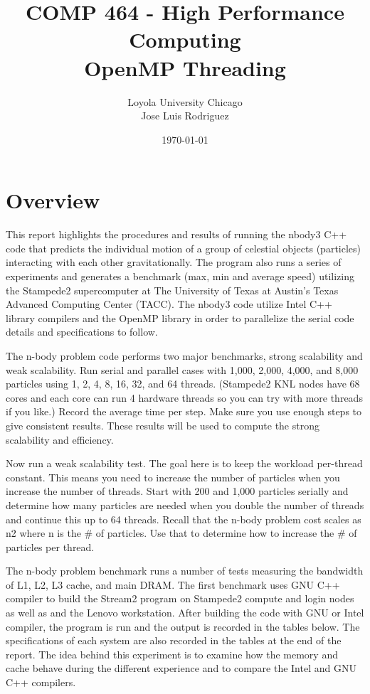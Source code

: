 \documentclass[12pt]{article} %
\title{ COMP 464 - High Performance Computing \\ OpenMP Threading} %
\author{
Loyola University Chicago \\
Jose Luis Rodriguez 
} %
\date{\today} %
\begin{document}
\maketitle

\thispagestyle{fancy}


\section{Overview}

This report highlights the procedures and results of running the nbody3 C++ code that predicts the individual motion of a group of celestial objects (particles) interacting with each other gravitationally. The program also runs a series of experiments and generates a benchmark (max, min and average speed) utilizing the Stampede2 supercomputer at The University of Texas at Austin's Texas Advanced Computing Center (TACC). The nbody3 code utilize Intel C++ library compilers and the OpenMP library in order to parallelize the serial code details and specifications to follow. 

The n-body problem code performs two major benchmarks, strong scalability and weak scalability. 
Run serial and parallel cases with 1,000, 2,000, 4,000, and 8,000 particles using 1, 2, 4, 8, 16, 32, and 64 threads. (Stampede2 KNL nodes have 68 cores and each core can run 4 hardware threads so you can try with more threads if you like.) Record the average time per step. Make sure you use enough steps to give consistent results. These results will be used to compute the strong scalability and efficiency.

Now run a weak scalability test. The goal here is to keep the workload per-thread constant. This means you need to increase the number of particles when you increase the number of threads. Start with 200 and 1,000 particles serially and determine how many particles are needed when you double the number of threads and continue this up to 64 threads. Recall that the n-body problem cost scales as n2 where n is the \# of particles. Use that to determine how to increase the \# of particles per thread.

The n-body problem benchmark runs a number of tests measuring the bandwidth of L1, L2, L3 cache, and main DRAM. The first benchmark uses GNU C++ compiler to build the Stream2 program on Stampede2 compute and login nodes as well as and the Lenovo workstation. After building the code with GNU or Intel compiler, the program is run and the output is recorded in the tables below. The specifications of each system are also recorded in the tables at the end of the report. The idea behind this experiment is to examine how the memory and cache behave during the different experience and to compare the Intel and GNU C++ compilers. 
\end{document}
